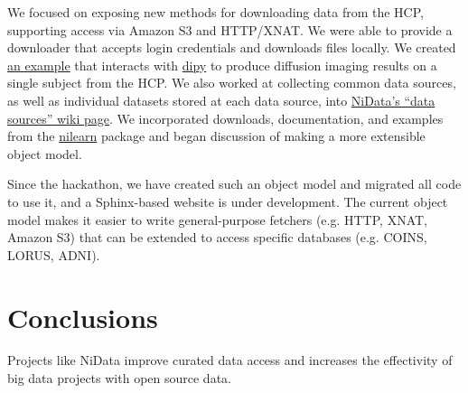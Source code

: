 \documentclass[twocolumn]{bmcart}%
\begin{document}
We focused on exposing new methods for downloading data from the HCP,
supporting access via Amazon S3 and HTTP/XNAT. We
were able to provide a downloader that accepts login credentials and
downloads files locally. We created
\href{https://github.com/arokem/nidata/blob/bcipolli-ohbm2015-ipynb/ipynb/hcp-fetcher-dwi.ipynb}{an
example} that interacts with \href{https://github.com/nipy/dipy}{dipy}
to produce diffusion imaging results on a single subject from the HCP.
We also worked at collecting common data sources, as well as individual
datasets stored at each data source, into
\href{https://github.com/nidata/nidata/wiki/Data-sources}{NiData's
``data sources'' wiki page}. We incorporated downloads, documentation,
and examples from the \href{http://github.com/nilearn/nilearn}{nilearn}
package and began discussion of making a more extensible object model.

Since the hackathon, we have created such an object model and migrated
all code to use it, and a Sphinx-based website is under development.
The current object model makes it easier to write general-purpose fetchers (e.g. HTTP, XNAT, Amazon S3) that can be extended to access specific databases (e.g. COINS, LORUS, ADNI).

\section{Conclusions}\label{conclusions}

Projects like NiData improve curated data access and increases the
effectivity of big data projects with open source data.

\end{document}
